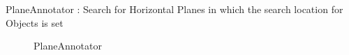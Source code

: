 \documentclass[main.tex]{subfiles}
\begin{document}
\begin{itemize}
    \begin{minipage}[t]{\textwidth}
    \item PlaneAnnotator : Search for Horizontal Planes in which the search location for Objects is set
        \begin{figure}[H]
                \centering
                \caption{PlaneAnnotator}
          \end{figure}
    \end{minipage}
    

\end{itemize}
\end{document}
